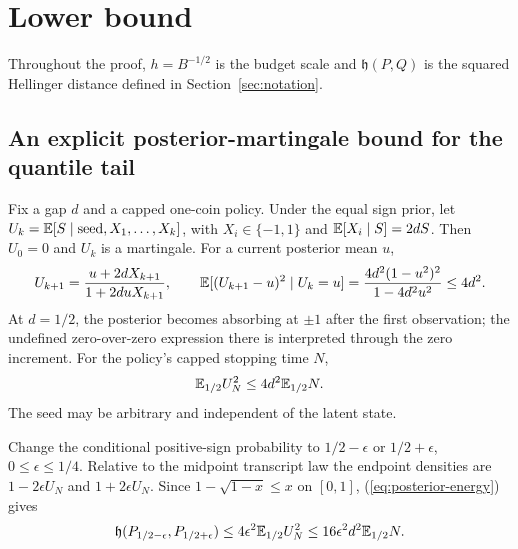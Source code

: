 \section{Lower bound}\label{sec:matching-lower}
Throughout the proof, $h=B^{-1/2}$ is the budget scale and
$\mathfrak h(P,Q)$ is the squared Hellinger distance defined in
Section~\ref{sec:notation}.

\subsection{An explicit posterior-martingale bound for the quantile tail}
Fix a gap $d$ and a capped one-coin policy. Under the equal sign prior,
let $U_k=\mathbb E[S\mid\text{seed},X_1,\ldots,X_k]$, with $X_i\in\{-1,1\}$
and $\mathbb E[X_i\mid S]=2dS$. Then $U_0=0$ and $U_k$ is a martingale.
For a current posterior mean $u$,
\[
 U_{k+1}=\frac{u+2dX_{k+1}}{1+2duX_{k+1}},\qquad
 \mathbb E[(U_{k+1}-u)^2\mid U_k=u]
 =\frac{4d^2(1-u^2)^2}{1-4d^2u^2}\le4d^2.
\]
At $d=1/2$, the posterior becomes absorbing at $\pm1$ after the first
observation; the undefined zero-over-zero expression there is interpreted
through the zero increment. For the policy's capped stopping time $N$,
\begin{equation}\label{eq:posterior-energy}
                         \mathbb E_{1/2}U_N^2\le4d^2\mathbb E_{1/2}N.
\end{equation}
The seed may be arbitrary and independent of the latent state.

Change the conditional positive-sign probability to
$1/2-\epsilon$ or $1/2+\epsilon$, $0\le\epsilon\le1/4$.
Relative to the midpoint transcript law the endpoint densities are
$1-2\epsilon U_N$ and $1+2\epsilon U_N$.
Since $1-\sqrt{1-x}\le x$ on $[0,1]$, (\ref{eq:posterior-energy}) gives
\begin{equation}\label{eq:explicit-tail-local}
 \mathfrak h(P_{1/2-\epsilon},P_{1/2+\epsilon})
 \le4\epsilon^2\mathbb E_{1/2}U_N^2
 \le16\epsilon^2d^2\mathbb E_{1/2}N.
\end{equation}

